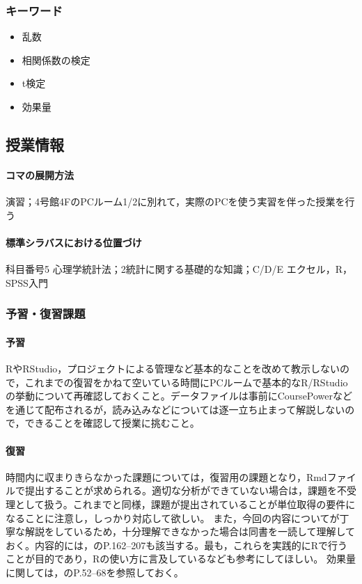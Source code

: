\subsubsection{キーワード}
\begin{itemize}
\item 乱数
\item 相関係数の検定
\item t検定
\item 効果量
\end{itemize}
\subsection{授業情報}
\paragraph{コマの展開方法}
演習；4号館4FのPCルーム1/2に別れて，実際のPCを使う実習を伴った授業を行う
\paragraph{標準シラバスにおける位置づけ}
科目番号5 心理学統計法；2統計に関する基礎的な知識；C/D/E エクセル，R，SPSS入門
\subsubsection{予習・復習課題}
\paragraph{予習}
RやRStudio，プロジェクトによる管理など基本的なことを改めて教示しないので，これまでの復習をかねて空いている時間にPCルームで基本的なR/RStudioの挙動について再確認しておくこと。データファイルは事前にCoursePowerなどを通じて配布されるが，読み込みなどについては逐一立ち止まって解説しないので，できることを確認して授業に挑むこと。
\paragraph{復習}
時間内に収まりきらなかった課題については，復習用の課題となり，Rmdファイルで提出することが求められる。適切な分析ができていない場合は，課題を不受理として扱う。これまでと同様，課題が提出されていることが単位取得の要件になることに注意し，しっかり対応して欲しい。
また，今回の内容について\citet{橋本201607}が丁寧な解説をしているため，十分理解できなかった場合は同書を一読して理解しておく。内容的には，\citet{Yamada2004}のP.162--207も該当する。最も，これらを実践的にRで行うことが目的であり，Rの使い方に言及している\citet{kosugi2019}なども参考にしてほしい。
効果量に関しては，\citet{大久保201201}のP.52--68を参照しておく。